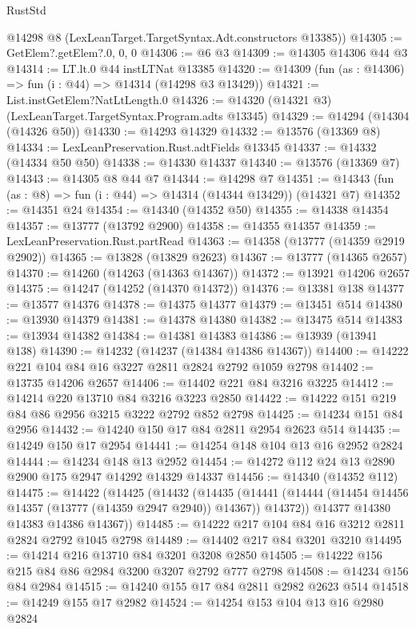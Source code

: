 \begin{lexlean}{RustStd}
\begin{coremodule}
    @14298 @8 (LexLeanTarget.TargetSyntax.Adt.constructors @13385))
@14305 := GetElem?.getElem?.{0, 0, 0}
@14306 := @6 @3
@14309 := @14305 @14306 @44 @3
@14314 := LT.lt.{0} @44 instLTNat @13385
@14320 := @14309 (fun (as : @14306) => fun (i : @44) => @14314 (@14298 @3 @13429))
@14321 := List.instGetElem?NatLtLength.{0}
@14326 := @14320 (@14321 @3) (LexLeanTarget.TargetSyntax.Program.adts @13345)
@14329 := @14294 (@14304 (@14326 @50))
@14330 := @14293 @14329
@14332 := @13576 (@13369 @8)
@14334 := LexLeanPreservation.Rust.adtFields @13345
@14337 := @14332 (@14334 @50 @50)
@14338 := @14330 @14337
@14340 := @13576 (@13369 @7)
@14343 := @14305 @8 @44 @7
@14344 := @14298 @7
@14351 := @14343 (fun (as : @8) => fun (i : @44) => @14314 (@14344 @13429)) (@14321 @7)
@14352 := @14351 @24
@14354 := @14340 (@14352 @50)
@14355 := @14338 @14354
@14357 := @13777 (@13792 @2900)
@14358 := @14355 @14357
@14359 := LexLeanPreservation.Rust.partRead
@14363 := @14358 (@13777 (@14359 @2919 @2902))
@14365 := @13828 (@13829 @2623)
@14367 := @13777 (@14365 @2657)
@14370 := @14260 (@14263 (@14363 @14367))
@14372 := @13921 @14206 @2657
@14375 := @14247 (@14252 (@14370 @14372))
@14376 := @13381 @138
@14377 := @13577 @14376
@14378 := @14375 @14377
@14379 := @13451 @514
@14380 := @13930 @14379
@14381 := @14378 @14380
@14382 := @13475 @514
@14383 := @13934 @14382
@14384 := @14381 @14383
@14386 := @13939 (@13941 @138)
@14390 := @14232 (@14237 (@14384 @14386 @14367))
@14400 := @14222 @221 @104 @84 @16 @3227 @2811 @2824 @2792 @1059 @2798
@14402 := @13735 @14206 @2657
@14406 := @14402 @221 @84 @3216 @3225
@14412 := @14214 @220 @13710 @84 @3216 @3223 @2850
@14422 := @14222 @151 @219 @84 @86 @2956 @3215 @3222 @2792 @852 @2798
@14425 := @14234 @151 @84 @2956
@14432 := @14240 @150 @17 @84 @2811 @2954 @2623 @514
@14435 := @14249 @150 @17 @2954
@14441 := @14254 @148 @104 @13 @16 @2952 @2824
@14444 := @14234 @148 @13 @2952
@14454 := @14272 @112 @24 @13 @2890 @2900 @175 @2947 @14292 @14329 @14337
@14456 := @14340 (@14352 @112)
@14475 := @14422
    (@14425
      (@14432
        (@14435
          (@14441 (@14444 (@14454 @14456 @14357 (@13777 (@14359 @2947 @2940)) @14367)) @14372))
        @14377
        @14380
        @14383
        @14386
        @14367))
@14485 := @14222 @217 @104 @84 @16 @3212 @2811 @2824 @2792 @1045 @2798
@14489 := @14402 @217 @84 @3201 @3210
@14495 := @14214 @216 @13710 @84 @3201 @3208 @2850
@14505 := @14222 @156 @215 @84 @86 @2984 @3200 @3207 @2792 @777 @2798
@14508 := @14234 @156 @84 @2984
@14515 := @14240 @155 @17 @84 @2811 @2982 @2623 @514
@14518 := @14249 @155 @17 @2982
@14524 := @14254 @153 @104 @13 @16 @2980 @2824

\end{coremodule}
\end{lexlean}
